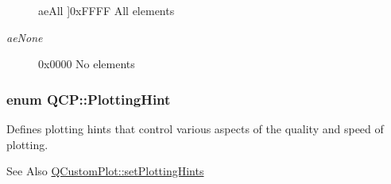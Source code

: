 \begin{Desc}
\begin{description}
{\hypertarget{namespaceQCP_ae55dbe315d41fe80f29ba88100843a0caa897c232a0ffc8368e7c100ffc59ef31}{ae\-All}\label{namespaceQCP_ae55dbe315d41fe80f29ba88100843a0caa897c232a0ffc8368e7c100ffc59ef31}
}]{\ttfamily 0x\-F\-F\-F\-F} All elements \item[{\em 
\hypertarget{namespaceQCP_ae55dbe315d41fe80f29ba88100843a0caa9e90d81896358757d94275aeaa58f6a}{ae\-None}\label{namespaceQCP_ae55dbe315d41fe80f29ba88100843a0caa9e90d81896358757d94275aeaa58f6a}
}]{\ttfamily 0x0000} No elements \end{description}
\end{Desc}
\hypertarget{namespaceQCP_a5400e5fcb9528d92002ddb938c1f4ef4}{
\subsubsection[{Plotting\-Hint}]{\setlength{\rightskip}{0pt plus 5cm}enum {\bf Q\-C\-P\-::\-Plotting\-Hint}}}\label{namespaceQCP_a5400e5fcb9528d92002ddb938c1f4ef4}
Defines plotting hints that control various aspects of the quality and speed of plotting. \begin{DoxySeeAlso}{See Also}
\hyperlink{classQCustomPlot_a94a33cbdadbbac5934843508bcfc210d}{Q\-Custom\-Plot\-::set\-Plotting\-Hints} 
\end{DoxySeeAlso}
